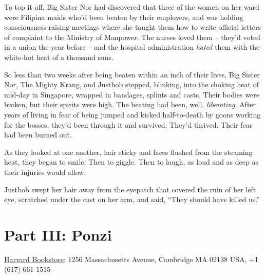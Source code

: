 To top it off, Big Sister Nor had discovered that three of the
women on her ward were Filipina maids who'd been beaten by their
employers, and was holding consciousness-raising meetings where she
taught them how to write official letters of complaint to the
Ministry of Manpower. The nurses loved them -- they'd voted in a
union the year before -- and the hospital administration
\emph{hated} them with the white-hot heat of a thousand suns.

So less than two weeks after being beaten within an inch of their
lives, Big Sister Nor, The Mighty Krang, and Justbob stepped,
blinking, into the choking heat of mid-day in Singapore, wrapped in
bandages, splints and casts. Their bodies were broken, but their
spirits were high. The beating had been, well, \emph{liberating}.
After years of living in fear of being jumped and kicked
half-to-death by goons working for the bosses, they'd been through
it and survived. They'd thrived. Their fear had been burned out.

As they looked at one another, hair sticky and faces flushed from
the steaming heat, they began to smile. Then to giggle. Then to
laugh, as loud and as deep as their injuries would allow.

Justbob swept her hair away from the eyepatch that covered the ruin
of her left eye, scratched under the cast on her arm, and said,
``They should have killed us.''

\chapter*{Part III: Ponzi}

{\href{http://www.harvard.com/}{Harvard Bookstore}: 1256 Massachusetts Avenue, Cambridge MA 02138 USA, +1 (617) 661-1515}

